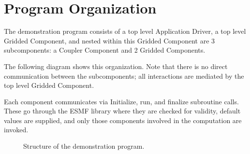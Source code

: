 
\section{Program Organization}

The demonstration program consists of a top level Application
Driver, a top level Gridded Component, and nested within this Gridded
Component are 3 subcomponents: a Coupler Component and 2 Gridded Components.

The following diagram shows this organization.  Note that there
is no direct communication between the subcomponents; all
interactions are mediated by the top level Gridded Component.

Each component communicates via Initialize, run, and finalize
subroutine calls.  These go through the ESMF library where
they are checked for validity, default values are supplied,
and only those components involved in the computation are
invoked.


\begin{figure}[bpht]
\caption[Components]{Structure of the demonstration program.}
\label{fig:democomps}
\begin{center}
\end{center}
\end{figure}


